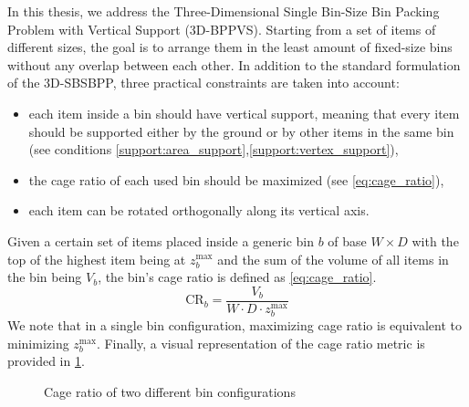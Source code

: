 In this thesis, we address the Three-Dimensional Single Bin-Size Bin Packing Problem with Vertical Support (3D-BPPVS).
Starting from a set of items of different sizes, the goal is to arrange them in the least amount of fixed-size bins without any overlap between each other.
In addition to the standard formulation of the 3D-SBSBPP, three practical constraints are taken into account:
\begin{itemize}
    \item each item inside a bin should have vertical support, meaning that every item should be supported either by the ground or by other items in the same bin (see conditions \ref{support:area_support},\ref{support:vertex_support}),
    \item the cage ratio of each used bin should be maximized (see \cref{eq:cage_ratio}),
    \item each item can be rotated orthogonally along its vertical axis.
\end{itemize}

Given a certain set of items placed inside a generic bin $b$ of base $W \times D$ with the top of the highest item being at $z_b^\text{max}$ and the sum of the volume of all items in the bin being $V_b$, the bin's cage ratio is defined as \cref{eq:cage_ratio}.
\begin{equation}
    \label{eq:cage_ratio}
    \text{CR}_b = \frac{V_b}{W \cdot D \cdot z_b^\text{max}}
\end{equation}
We note that in a single bin configuration, maximizing cage ratio is equivalent to minimizing $z_b^\text{max}$. Finally, a visual representation of the cage ratio metric is provided in \cref{fig:cage_ratio}.

\begin{figure}[H]
    \scalebox{0.60}{%
    
    }
    \caption{Cage ratio of two different bin configurations}
    \label{fig:cage_ratio}
\end{figure}

